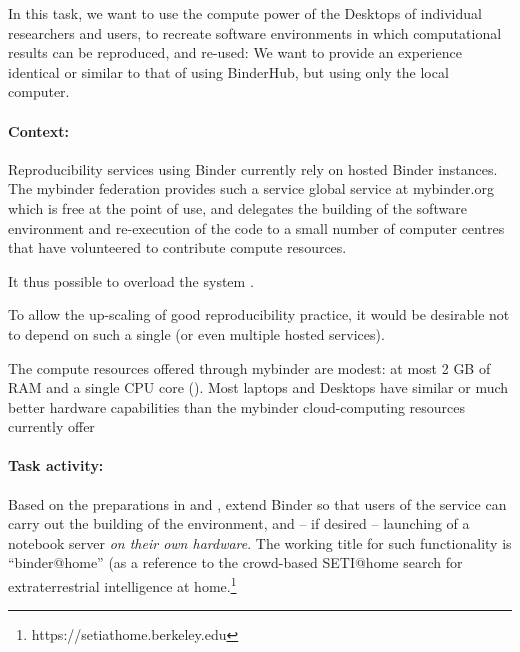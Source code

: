 \begin{task}[
  title=Binder@Home,
  id=binder-at-home,
  lead=SRL,
  PM=6,
  wphases={0-36},
  partners={MP,UIO}
]
In this task, we want to use the compute power of the Desktops of individual researchers and
users, to recreate software environments in which computational results can be
reproduced, and re-used: We want to provide an experience identical or similar
to that of using BinderHub, but using only the local computer.

\paragraph*{Context:} Reproducibility services using Binder currently rely on hosted Binder instances.
The mybinder federation provides such a service global service at mybinder.org
which is free at
the point of use, and delegates the building of the software environment and
re-execution of the code to a small number of computer centres that have
volunteered to contribute compute resources.

It thus possible to overload the system .

To allow the up-scaling of good reproducibility practice, it would be
desirable not to depend on such a single (or even multiple hosted services).

The compute resources offered through mybinder are modest: at most 2 GB of RAM
and a single CPU core ().
Most laptops and Desktops have similar or much better hardware capabilities than
the mybinder cloud-computing resources currently offer

\paragraph*{Task activity:} Based on the preparations in  and
, extend Binder so that users of the service can
carry out the building of the environment, and -- if desired -- launching of a
notebook server \emph{on their own hardware}. The working title for such
functionality is ``binder@home'' (as a reference to the crowd-based SETI@home search for
extraterrestrial intelligence at home.\footnote{https://setiathome.berkeley.edu}


\end{task}
